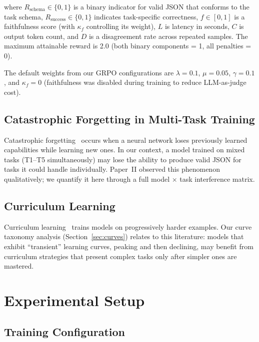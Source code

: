 \documentclass[11pt]{article}
\begin{document}
where $R_{\text{schema}} \in \{0, 1\}$ is a binary indicator for valid JSON that conforms to the task schema, $R_{\text{success}} \in \{0, 1\}$ indicates task-specific correctness, $f \in [0,1]$ is a faithfulness score (with $\kappa_f$ controlling its weight), $L$ is latency in seconds, $C$ is output token count, and $D$ is a disagreement rate across repeated samples.  The maximum attainable reward is 2.0 (both binary components = 1, all penalties = 0).

The default weights from our GRPO configurations are $\lambda = 0.1$, $\mu = 0.05$, $\gamma = 0.1$, and $\kappa_f = 0$ (faithfulness was disabled during training to reduce LLM-as-judge cost).

\subsection{Catastrophic Forgetting in Multi-Task Training}

Catastrophic forgetting~\cite{mccloskey1989catastrophic, french1999catastrophic} occurs when a neural network loses previously learned capabilities while learning new ones.  In our context, a model trained on mixed tasks (T1--T5 simultaneously) may lose the ability to produce valid JSON for tasks it could handle individually.  Paper~II observed this phenomenon qualitatively; we quantify it here through a full model $\times$ task interference matrix.

\subsection{Curriculum Learning}

Curriculum learning~\cite{bengio2009curriculum} trains models on progressively harder examples.  Our curve taxonomy analysis (Section~\ref{sec:curves}) relates to this literature: models that exhibit ``transient'' learning curves, peaking and then declining, may benefit from curriculum strategies that present complex tasks only after simpler ones are mastered.

\section{Experimental Setup}

\subsection{Training Configuration}
\end{document}
